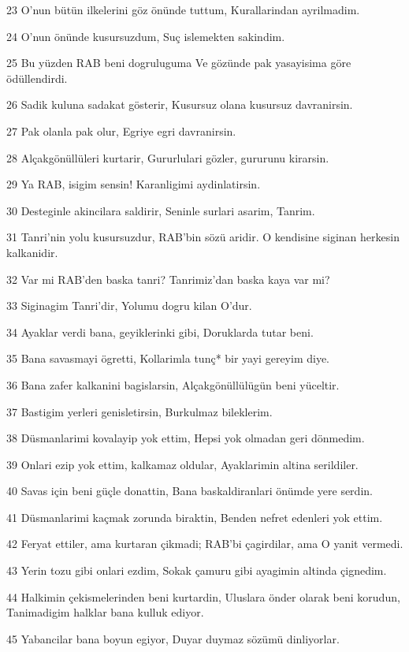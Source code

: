 \par 23 O'nun bütün ilkelerini göz önünde tuttum, Kurallarindan ayrilmadim.
\par 24 O'nun önünde kusursuzdum, Suç islemekten sakindim.
\par 25 Bu yüzden RAB beni dogruluguma Ve gözünde pak yasayisima göre ödüllendirdi.
\par 26 Sadik kuluna sadakat gösterir, Kusursuz olana kusursuz davranirsin.
\par 27 Pak olanla pak olur, Egriye egri davranirsin.
\par 28 Alçakgönüllüleri kurtarir, Gururlulari gözler, gururunu kirarsin.
\par 29 Ya RAB, isigim sensin! Karanligimi aydinlatirsin.
\par 30 Desteginle akincilara saldirir, Seninle surlari asarim, Tanrim.
\par 31 Tanri'nin yolu kusursuzdur, RAB'bin sözü aridir. O kendisine siginan herkesin kalkanidir.
\par 32 Var mi RAB'den baska tanri? Tanrimiz'dan baska kaya var mi?
\par 33 Siginagim Tanri'dir, Yolumu dogru kilan O'dur.
\par 34 Ayaklar verdi bana, geyiklerinki gibi, Doruklarda tutar beni.
\par 35 Bana savasmayi ögretti, Kollarimla tunç* bir yayi gereyim diye.
\par 36 Bana zafer kalkanini bagislarsin, Alçakgönüllülügün beni yüceltir.
\par 37 Bastigim yerleri genisletirsin, Burkulmaz bileklerim.
\par 38 Düsmanlarimi kovalayip yok ettim, Hepsi yok olmadan geri dönmedim.
\par 39 Onlari ezip yok ettim, kalkamaz oldular, Ayaklarimin altina serildiler.
\par 40 Savas için beni güçle donattin, Bana baskaldiranlari önümde yere serdin.
\par 41 Düsmanlarimi kaçmak zorunda biraktin, Benden nefret edenleri yok ettim.
\par 42 Feryat ettiler, ama kurtaran çikmadi; RAB'bi çagirdilar, ama O yanit vermedi.
\par 43 Yerin tozu gibi onlari ezdim, Sokak çamuru gibi ayagimin altinda çignedim.
\par 44 Halkimin çekismelerinden beni kurtardin, Uluslara önder olarak beni korudun, Tanimadigim halklar bana kulluk ediyor.
\par 45 Yabancilar bana boyun egiyor, Duyar duymaz sözümü dinliyorlar.
